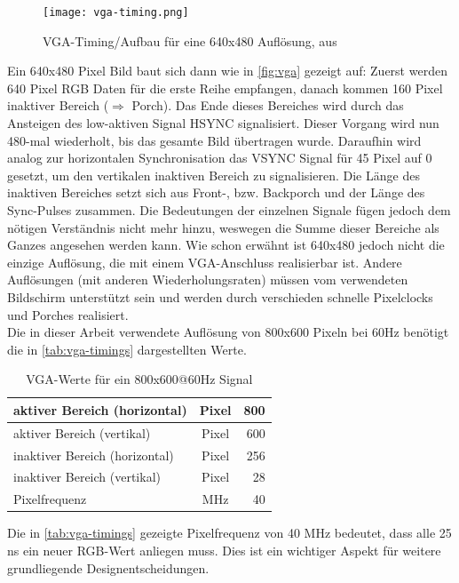 \documentclass[a4paper,12pt,onesided]{report}
\begin{document}
\begin{figure}[H]
	\centering
	\texttt{[image: vga-timing.png]}
	\caption{VGA-Timing/Aufbau für eine 640x480 Auflösung, aus \cite{vga-timing}}
	\label{fig:vga}
\end{figure}

Ein 640x480 Pixel Bild baut sich dann wie in \autoref{fig:vga} gezeigt auf:
Zuerst werden 640 Pixel RGB Daten für die erste Reihe empfangen, danach kommen 160 Pixel inaktiver Bereich ($\Rightarrow$ Porch). 
Das Ende dieses Bereiches wird durch das Ansteigen des low-aktiven Signal HSYNC signalisiert. Dieser Vorgang wird nun 480-mal wiederholt, bis das gesamte Bild übertragen wurde. 
Daraufhin wird analog zur horizontalen Synchronisation das VSYNC Signal für 45 Pixel auf 0 gesetzt, um den vertikalen inaktiven Bereich zu signalisieren.
Die Länge des inaktiven Bereiches setzt sich aus Front-, bzw. Backporch und der Länge des Sync-Pulses zusammen. 
Die Bedeutungen der einzelnen Signale fügen jedoch dem nötigen Verständnis nicht mehr hinzu, weswegen die Summe dieser Bereiche als Ganzes angesehen werden kann.
Wie schon erwähnt ist 640x480 jedoch nicht die einzige Auflösung, die mit einem VGA-Anschluss realisierbar ist.
Andere Auflösungen (mit anderen Wiederholungsraten) müssen vom verwendeten Bildschirm unterstützt sein und werden durch verschieden schnelle Pixelclocks und Porches realisiert.\\
Die in dieser Arbeit verwendete Auflösung von 800x600 Pixeln bei 60Hz benötigt die in \autoref{tab:vga-timings} dargestellten Werte.

\begin{table}[H]
	\centering
	\begin{tabular}{|l|c|r|}	
		\hline
		aktiver Bereich (horizontal) & Pixel & 800 \\ \hline
		aktiver Bereich (vertikal) & Pixel & 600 \\ \hline
		inaktiver Bereich (horizontal) & Pixel & 256 \\ \hline
		inaktiver Bereich (vertikal) & Pixel & 28 \\ \hline
		Pixelfrequenz & MHz & 40 \\ \hline
	\end{tabular}
	\caption{VGA-Werte für ein 800x600@60Hz Signal}
	\label{tab:vga-timings}
\end{table}

Die in \autoref{tab:vga-timings} gezeigte Pixelfrequenz von 40 MHz bedeutet, dass alle 25 ns ein neuer RGB-Wert anliegen muss. Dies ist ein wichtiger Aspekt für weitere grundliegende Designentscheidungen.
\end{document}

